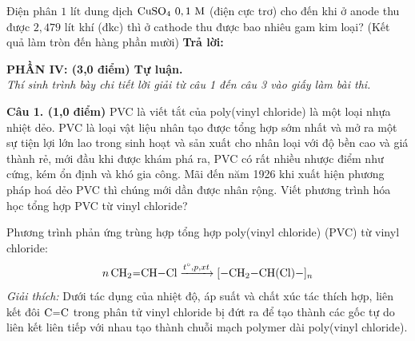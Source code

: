 \documentclass[11pt,a4paper]{article}
\begin{document}
\begin{ex}
Điện phân $1\text{ lít}$ dung dịch $\ce{CuSO4}\ 0,1\text{ M}$ (điện cực trơ) cho đến khi ở anode thu được $2,479\text{ lít}$ khí (đkc) thì ở cathode thu được bao nhiêu gam kim loại? (Kết quả làm tròn đến hàng phần mười)
\hfill \textbf{Trả lời:} \dotfill

\end{ex}
\vspace{4pt}
\noindent
{\color{mainGreen}\textbf{\large PHẦN IV: (3,0 điểm) Tự luận.}}\\
\textit{\small Thí sinh trình bày chi tiết lời giải từ câu 1 đến câu 3 vào giấy làm bài thi.}
\vspace{3pt}

\noindent
\textbf{Câu 1. (1,0 điểm)} PVC là viết tắt của poly(vinyl chloride) là một loại nhựa nhiệt dẻo. PVC là loại vật liệu nhân tạo được tổng hợp sớm nhất và mở ra một sự tiện lợi lớn lao trong sinh hoạt và sản xuất cho nhân loại với độ bền cao và giá thành rẻ, mới đầu khi được khám phá ra, PVC có rất nhiều nhược điểm như cứng, kém ổn định và khó gia công. Mãi đến năm 1926 khi xuất hiện phương pháp hoá dẻo PVC thì chúng mới dần được nhân rộng. Viết phương trình hóa học tổng hợp PVC từ vinyl chloride?

\begin{tcolorbox}[colback=tableGreen!30,colframe=mainGreen!70,title=\textbf{Hướng dẫn giải chi tiết Câu 1},fonttitle=\bfseries]
Phương trình phản ứng trùng hợp tổng hợp poly(vinyl chloride) (PVC) từ vinyl chloride:
\[
n\,\ce{CH2=CH-Cl} \xrightarrow{t^\circ, p, xt} \ce{[-CH2-CH(Cl)-]_n}
\]
\textit{Giải thích:} Dưới tác dụng của nhiệt độ, áp suất và chất xúc tác thích hợp, liên kết đôi $\ce{C=C}$ trong phân tử vinyl chloride bị đứt ra để tạo thành các gốc tự do liên kết liên tiếp với nhau tạo thành chuỗi mạch polymer dài poly(vinyl chloride).
\end{tcolorbox}
\end{document}
